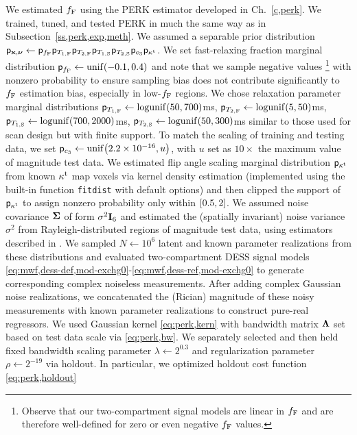 We estimated $f_{\mathrm{F}}$ 
using the PERK estimator
developed in Ch.~\ref{c,perk}.
We trained, tuned, and tested PERK
in much the same way 
as in Subsection~\ref{ss,perk,exp,meth}.
We assumed a separable prior distribution
$\mathsf{p}_{\mathbf{x},\boldsymbol{\nu}} \gets 
	\mathsf{p}_{f_{\mathrm{F}}}\mathsf{p}_{T_{1,\mathrm{F}}}\mathsf{p}_{T_{2,\mathrm{F}}}
	\mathsf{p}_{T_{1,\mathrm{S}}}\mathsf{p}_{T_{2,\mathrm{S}}}\mathsf{p}_{c_{3}}\mathsf{p}_{\kappa^{\mathrm{t}}}$.
We set fast-relaxing fraction marginal distribution 
$\dist{\ff} \gets \unif{-0.1,0.4}$ 
and note that we sample negative values
\footnote{%
	Observe that our two-compartment signal models
	are linear in $f_{\mathrm{F}}$
	and are therefore well-defined
	for zero or even negative $f_{\mathrm{F}}$ values.
}
with nonzero probability
to ensure sampling bias
does not contribute significantly
to $f_{\mathrm{F}}$ estimation bias,
especially in low-$f_{\mathrm{F}}$ regions.
We chose relaxation parameter marginal distributions
$\dist{\tf{1}} \gets \logunif{50,700}$ms,
$\dist{\tf{2}} \gets \logunif{5,50}$ms,
$\dist{\ts{1}} \gets \logunif{700,2000}$ms,
$\dist{\ts{2}} \gets \logunif{50,300}$ms
similar to those 
used for scan design
but with finite support.
To match the scaling 
of training and testing data,
we set $\dist{\const{3}} \gets \unif{2.2 \times 10^{-16},u}$,
with $u$ set as $10\times$ the maximum value 
of magnitude test data.
We estimated flip angle scaling marginal distribution $\mathsf{p}_{\kappa^{\mathrm{t}}}$
from known $\kappa^{\mathrm{t}}$ map voxels
via kernel density estimation 
(implemented using the built-in \matlab function \texttt{fitdist}
with default options)
and then clipped the support of $\mathsf{p}_{\kappa^{\mathrm{t}}}$
to assign nonzero probability
only within $\brac{0.5,2}$.
We assumed noise covariance $\boldsymbol{\Sigma}$
of form $\sigma^2 \mathbf{I}_{6}$ 
and estimated the (spatially invariant) noise variance $\sigma^2$
from Rayleigh-distributed regions
of magnitude test data,
using estimators described 
in \cite{siddiqui:64:sif}.
We sampled $N \gets 10^6$ latent and known parameter realizations
from these distributions
and evaluated two-compartment DESS signal models
\eqref{eq:mwf,dess-def,mod-exchg0}-\eqref{eq:mwf,dess-ref,mod-exchg0}
to generate corresponding complex noiseless measurements.
After adding complex Gaussian noise realizations,
we concatenated the (Rician) magnitude 
of these noisy measurements
with known parameter realizations
to construct pure-real regressors.
We used Gaussian kernel \eqref{eq:perk,kern}
with bandwidth matrix $\boldsymbol{\Lambda}$ 
set based on test data scale
via \eqref{eq:perk,bw}.
We separately selected 
and then held fixed 
bandwidth scaling parameter $\lambda \gets 2^{0.3}$ 
and regularization parameter $\rho \gets 2^{-19}$ 
via holdout.
In particular,
we optimized holdout cost function \eqref{eq:perk,holdout}
